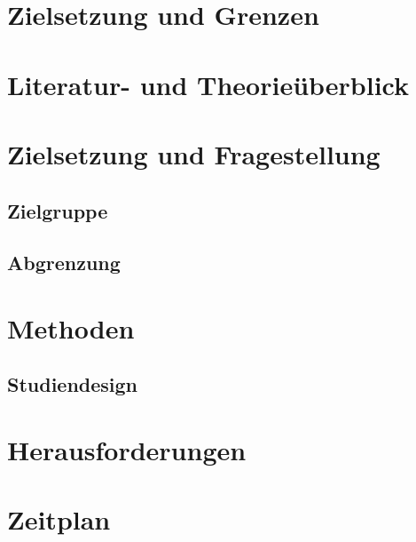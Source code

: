 \documentclass[
    a4paper,
    doc,
    12pt,
    natbib,
]{apa6}
\begin{document}
\section{Zielsetzung und Grenzen}

\section{Literatur- und Theorieüberblick}

\section{Zielsetzung und Fragestellung }

\subsection{Zielgruppe}

\subsection{Abgrenzung}

\section{Methoden}

\subsection{Studiendesign}

\section{Herausforderungen}

\section{Zeitplan}



\end{document}
